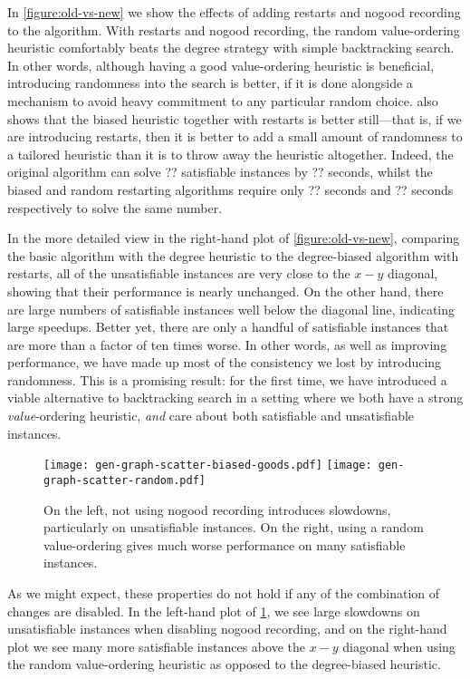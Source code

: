 \documentclass[runningheads]{llncs}
\begin{document}
In \cref{figure:old-vs-new} we show the effects of adding restarts and nogood recording to the
algorithm. With restarts and nogood recording, the random value-ordering heuristic comfortably beats
the degree strategy with simple backtracking search. In other words, although having a good
value-ordering heuristic is beneficial, introducing randomness into the search is better, if it is
done alongside a mechanism to avoid heavy commitment to any particular random choice.
 also shows that the biased heuristic together with restarts is better
still---that is, if we are introducing restarts, then it is better to add a small amount of
randomness to a tailored heuristic than it is to throw away the heuristic altogether.  Indeed, the
original algorithm can solve ?? satisfiable instances by ?? seconds, whilst the biased and
random restarting algorithms require only ?? seconds and ?? seconds respectively to solve the
same number.

In the more detailed view in the right-hand plot of \cref{figure:old-vs-new}, comparing the basic
algorithm with the degree heuristic to the degree-biased algorithm with restarts, all of the
unsatisfiable instances are very close to the $x-y$ diagonal, showing that their performance is
nearly unchanged. On the other hand, there are large numbers of satisfiable instances well below the
diagonal line, indicating large speedups.  Better yet, there are only a handful of satisfiable
instances that are more than a factor of ten times worse.  In other words, as well as improving
performance, we have made up most of the consistency we lost by introducing randomness.
This is a promising result: for the first time, we have introduced a viable alternative to
backtracking search in a setting where we both have a strong \emph{value}-ordering heuristic,
\emph{and} care about both satisfiable and unsatisfiable instances.

\begin{figure}[tb]
    \texttt{[image: gen-graph-scatter-biased-goods.pdf]}
    \hfill
    \texttt{[image: gen-graph-scatter-random.pdf]}
    \caption{On the left, not using nogood recording introduces slowdowns, particularly on
    unsatisfiable instances. On the right, using a random value-ordering gives much worse
    performance on many satisfiable instances.}
    \label{figure:features}
\end{figure}

As we might expect, these properties do not hold if any of the combination of changes are disabled.
In the left-hand plot of \cref{figure:features}, we see large slowdowns on unsatisfiable instances
when disabling nogood recording, and on the right-hand plot we see many more satisfiable instances
above the $x-y$ diagonal when using the random value-ordering heuristic as opposed to the
degree-biased heuristic.
\end{document}
